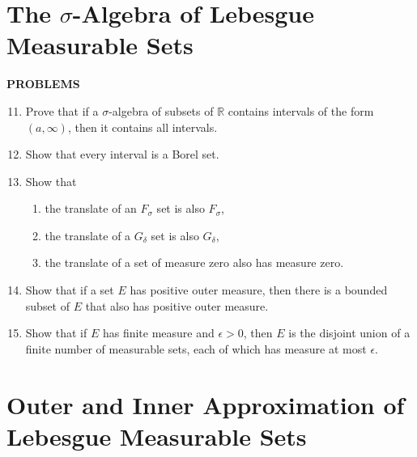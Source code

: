\section{The $\sigma$-Algebra of Lebesgue Measurable Sets}

\begin{center}
	\textbf{PROBLEMS}
\end{center}
\begin{enumerate}
	\setcounter{enumi}{10}
	\item Prove that if a $\sigma$-algebra of subsets of $\mathbb{R}$ contains intervals of the form $(a,\infty)$, then it contains all intervals.\\
	\item Show that every interval is a Borel set.
	\item Show that 
	\begin{enumerate}[label=(\roman*),align=left]
        \item the translate of an $F_\sigma$ set is also $F_\sigma$,
        \item the translate of a $G_\delta$ set is also $G_\delta$,
        \item the translate of a set of measure zero also has measure zero.
    \end{enumerate}
    \item Show that if a set $E$ has positive outer measure, then there is a bounded subset of $E$ that also has positive outer measure.
    \item Show that if $E$ has finite measure and $\epsilon>0$, then $E$ is the disjoint union of a finite number of measurable sets, each of which has measure at most $\epsilon$.
\end{enumerate}

\section{Outer and Inner Approximation of Lebesgue Measurable Sets}

